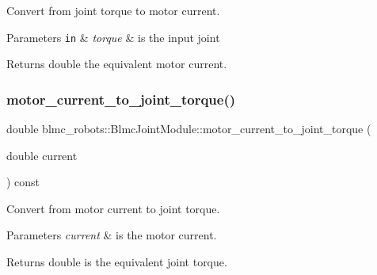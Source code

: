 Convert from joint torque to motor current. 


\begin{DoxyParams}[1]{Parameters}
\mbox{\tt in}  & {\em torque} & is the input joint \\
\hline
\end{DoxyParams}
\begin{DoxyReturn}{Returns}
double the equivalent motor current. 
\end{DoxyReturn}
\mbox{\label{classblmc__robots_1_1BlmcJointModule_aa300e4c820a6cd356ac77ba50829c50f}} 
\subsubsection{\texorpdfstring{motor\+\_\+current\+\_\+to\+\_\+joint\+\_\+torque()}{motor\_current\_to\_joint\_torque()}}
{\footnotesize\ttfamily double blmc\+\_\+robots\+::\+Blmc\+Joint\+Module\+::motor\+\_\+current\+\_\+to\+\_\+joint\+\_\+torque (\begin{DoxyParamCaption}\item[{double}]{current }\end{DoxyParamCaption}) const\hspace{0.3cm}{\ttfamily [private]}}



Convert from motor current to joint torque. 


\begin{DoxyParams}{Parameters}
{\em current} & is the motor current. \\
\hline
\end{DoxyParams}
\begin{DoxyReturn}{Returns}
double is the equivalent joint torque. 
\end{DoxyReturn}
\mbox{\label{classblmc__robots_1_1BlmcJointModule_af0484dd9efc47843706fc71d4351bdbd}} 
